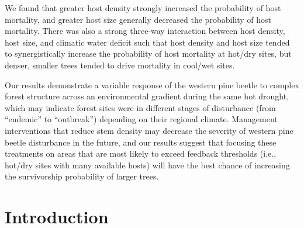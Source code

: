 \documentclass[twoside,12pt,final]{ucthesis-CA2012}
\begin{document}
\begin{ucmainmatter}
We found that greater host density strongly increased the probability of
host mortality, and greater host size generally decreased the
probability of host mortality. There was also a strong three-way
interaction between host density, host size, and climatic water deficit
such that host density and host size tended to synergistically increase
the probability of host mortality at hot/dry sites, but denser, smaller
trees tended to drive mortality in cool/wet sites.

Our results demonstrate a variable response of the western pine beetle
to complex forest structure across an environmental gradient during the
same hot drought, which may indicate forest sites were in different
stages of disturbance (from ``endemic'' to ``outbreak'') depending on
their regional climate. Management interventions that reduce stem
density may decrease the severity of western pine beetle disturbance in
the future, and our results suggest that focusing these treatments on
areas that are most likely to exceed feedback thresholds (i.e., hot/dry
sites with many available hosts) will have the best chance of increasing
the survivorship probability of larger trees.

\section{Introduction}\label{introduction-1}


\end{ucmainmatter}
\end{document}
